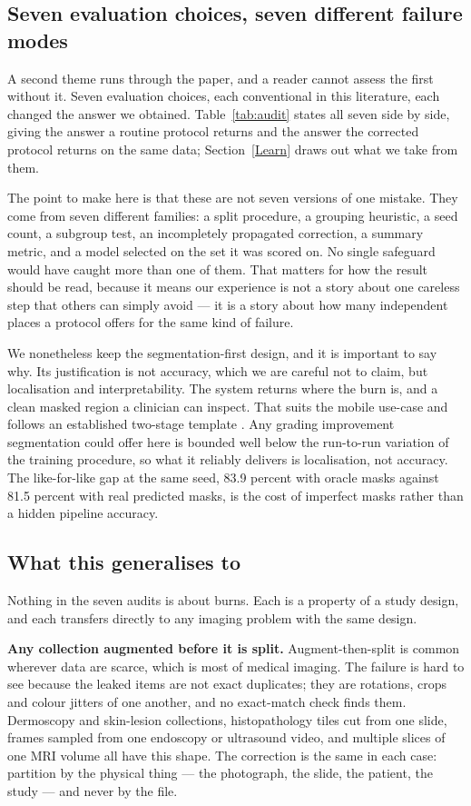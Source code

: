 \documentclass{melba}
\begin{document}
\subsection{Seven evaluation choices, seven different failure modes}
\label{Dis:seven}
A second theme runs through the paper, and a reader cannot assess the first without it. Seven evaluation choices, each conventional in this literature, each changed the answer we obtained. Table~\ref{tab:audit} states all seven side by side, giving the answer a routine protocol returns and the answer the corrected protocol returns on the same data; Section~\ref{Learn} draws out what we take from them.

The point to make here is that these are not seven versions of one mistake. They come from seven different families: a split procedure, a grouping heuristic, a seed count, a subgroup test, an incompletely propagated correction, a summary metric, and a model selected on the set it was scored on. No single safeguard would have caught more than one of them. That matters for how the result should be read, because it means our experience is not a story about one careless step that others can simply avoid --- it is a story about how many independent places a protocol offers for the same kind of failure.

We nonetheless keep the segmentation-first design, and it is important to say why. Its justification is not accuracy, which we are careful not to claim, but localisation and interpretability. The system returns where the burn is, and a clean masked region a clinician can inspect. That suits the mobile use-case and follows an established two-stage template \citep{bruno,almasni2020}. Any grading improvement segmentation could offer here is bounded well below the run-to-run variation of the training procedure, so what it reliably delivers is localisation, not accuracy. The like-for-like gap at the same seed, 83.9 percent with oracle masks against 81.5 percent with real predicted masks, is the cost of imperfect masks rather than a hidden pipeline accuracy.

\subsection{What this generalises to}
\label{Dis:gen}
Nothing in the seven audits is about burns. Each is a property of a study design, and each transfers directly to any imaging problem with the same design.

\textbf{Any collection augmented before it is split.} Augment-then-split is common wherever data are scarce, which is most of medical imaging. The failure is hard to see because the leaked items are not exact duplicates; they are rotations, crops and colour jitters of one another, and no exact-match check finds them. Dermoscopy and skin-lesion collections, histopathology tiles cut from one slide, frames sampled from one endoscopy or ultrasound video, and multiple slices of one MRI volume all have this shape. The correction is the same in each case: partition by the physical thing --- the photograph, the slide, the patient, the study --- and never by the file.
\end{document}
